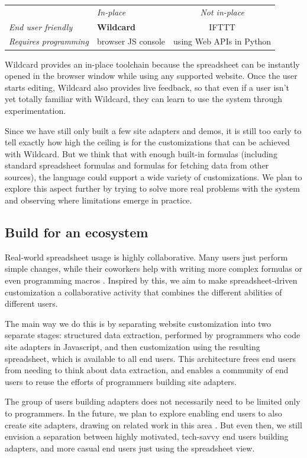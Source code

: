 \documentclass[english,submission]{programming}
\begin{document}
\begin{longtable}[]{@{}llc@{}}
\toprule
\endhead
& \emph{In-place} & \emph{Not in-place}\tabularnewline
\emph{End user friendly} & \textbf{Wildcard} & IFTTT\tabularnewline
\emph{Requires programming} & browser JS console & using Web APIs in
Python\tabularnewline
\bottomrule
\end{longtable}

Wildcard provides an in-place toolchain because the spreadsheet can be
instantly opened in the browser window while using any supported
website. Once the user starts editing, Wildcard also provides live
feedback, so that even if a user isn't yet totally familiar with
Wildcard, they can learn to use the system through experimentation.

Since we have still only built a few site adapters and demos, it is
still too early to tell exactly how high the ceiling is for the
customizations that can be achieved with Wildcard. But we think that
with enough built-in formulas (including standard spreadsheet formulas
and formulas for fetching data from other sources), the language could
support a wide variety of customizations. We plan to explore this aspect
further by trying to solve more real problems with the system and
observing where limitations emerge in practice.

\hypertarget{build-for-an-ecosystem}{%
\subsection{Build for an ecosystem}\label{build-for-an-ecosystem}}

Real-world spreadsheet usage is highly collaborative. Many users just
perform simple changes, while their coworkers help with writing more
complex formulas or even programming macros \autocite{nardi1990}.
Inspired by this, we aim to make spreadsheet-driven customization a
collaborative activity that combines the different abilities of
different users.

The main way we do this is by separating website customization into two
separate stages: structured data extraction, performed by programmers
who code site adapters in Javascript, and then customization using the
resulting spreadsheet, which is available to all end users. This
architecture frees end users from needing to think about data
extraction, and enables a community of end users to reuse the efforts of
programmers building site adapters.

The group of users building adapters does not necessarily need to be
limited only to programmers. In the future, we plan to explore enabling
end users to also create site adapters, drawing on related work in this
area \autocite{chasins2018,huynh2006}. But even then, we still envision
a separation between highly motivated, tech-savvy end users building
adapters, and more casual end users just using the spreadsheet view.
\end{document}
